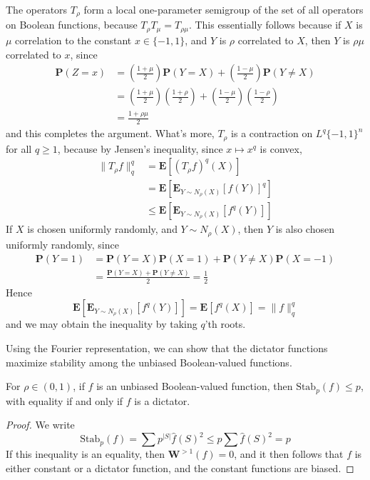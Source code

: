 The operators $T_\rho$ form a local one-parameter semigroup of the set of all operators on Boolean functions, because $T_\rho T_\mu = T_{\rho \mu}$. This essentially follows because if $X$ is $\mu$ correlation to the constant $x \in \{ -1, 1 \}$, and $Y$ is $\rho$ correlated to $X$, then $Y$ is $\rho \mu$ correlated to $x$, since
%
\begin{align*}
    \mathbf{P}(Z = x) &= \left( \frac{1 + \mu}{2} \right) \mathbf{P}(Y = X) + \left( \frac{1 - \mu}{2} \right) \mathbf{P}(Y \neq X)\\
    &= \left( \frac{1 + \mu}{2} \right) \left( \frac{1 + \rho}{2} \right) + \left( \frac{1 - \mu}{2} \right) \left( \frac{1 - \rho}{2} \right)\\
    &= \frac{1 + \rho \mu}{2}
\end{align*}
%
and this completes the argument. What's more, $T_\rho$ is a contraction on $L^q \{ -1,1 \}^n$ for all $q \geq 1$, because by Jensen's inequality, since $x \mapsto x^q$ is convex,
%
\begin{align*}
    \| T_\rho f \|^q_q &= \mathbf{E}[(T_\rho f)^q(X)]\\
    &= \mathbf{E}[\mathbf{E}_{Y \sim N_\rho(X)}[f(Y)]^q]\\
    &\leq \mathbf{E}[\mathbf{E}_{Y \sim N_\rho(X)}[f^q(Y)]]
\end{align*}
%
If $X$ is chosen uniformly randomly, and $Y \sim N_\rho(X)$, then $Y$ is also chosen uniformly randomly, since
%
\begin{align*}
    \mathbf{P}(Y = 1) &= \mathbf{P}(Y = X) \mathbf{P}(X = 1) + \mathbf{P}(Y \neq X) \mathbf{P}(X = -1)\\
    &= \frac{\mathbf{P}(Y = X) + \mathbf{P}(Y \neq X)}{2} = \frac{1}{2}
\end{align*}
%
Hence
%
\[ \mathbf{E}[\mathbf{E}_{Y \sim N_\rho(X)}[f^q(Y)]] = \mathbf{E}[f^q(X)] = \| f \|_q^q \]
%
and we may obtain the inequality by taking $q$'th roots.

Using the Fourier representation, we can show that the dictator functions maximize stability among the unbiased Boolean-valued functions.

\begin{theorem}
    For $\rho \in (0,1)$, if $f$ is an unbiased Boolean-valued function, then $\text{Stab}_p(f) \leq p$, with equality if and only if $f$ is a dictator.
\end{theorem}
\begin{proof}
    We write
    \[ \text{Stab}_p(f) = \sum p^{|S|} \widehat{f}(S)^2 \leq p \sum \widehat{f}(S)^2 = p \]
    If this inequality is an equality, then $\mathbf{W}^{> 1}(f) = 0$, and it then follows that $f$ is either constant or a dictator function, and the constant functions are biased.
\end{proof}

